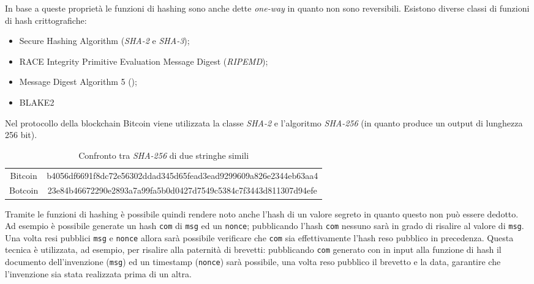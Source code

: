 In base a queste proprietà le funzioni di hashing sono anche dette \textit{one-way} in quanto non sono reversibili.\newline\newline
Esistono diverse classi di funzioni di hash crittografiche:
\begin{itemize}
    \item Secure Hashing Algorithm (\textit{SHA-2} e \textit{SHA-3});
    \item RACE Integrity Primitive  Evaluation Message Digest (\textit{RIPEMD});
    \item Message Digest Algorithm 5 ();
    \item BLAKE2
\end{itemize}

Nel protocollo della blockchain Bitcoin viene utilizzata la classe \textit{SHA-2} e l'algoritmo \textit{SHA-256} (in quanto produce un output di lunghezza 256 bit).
\begin{table}
    \caption{Confronto tra \textit{SHA-256} di due stringhe simili}
    \centering
    \begin{tabular}{c||c}
        Bitcoin & b4056df6691f8dc72e56302ddad345d65fead3ead9299609a826e2344eb63aa4 \\
        \cline{1-2}
        Botcoin & 23e84b46672290e2893a7a99fa5b0d0427d7549c5384c7f3443d811307d94efe \\
    \end{tabular}
\end{table}
Tramite le funzioni di hashing è possibile quindi rendere noto anche l'hash di un valore segreto in quanto questo non può essere dedotto. Ad esempio è possibile generate un hash \texttt{com} di \texttt{msg} ed un \texttt{nonce}; pubblicando l'hash \texttt{com} nessuno sarà in grado di risalire al valore di \texttt{msg}. Una volta resi pubblici \texttt{msg} e \texttt{nonce} allora sarà possibile verificare che \texttt{com} sia effettivamente l'hash reso pubblico in precedenza.\newline
Questa tecnica è utilizzata, ad esempio, per risalire alla paternità di brevetti: pubblicando \texttt{com} generato con in input alla funzione di hash il documento dell'invenzione (\texttt{msg}) ed un timestamp (\texttt{nonce}) sarà possibile, una volta reso pubblico il brevetto e la data, garantire che l'invenzione sia stata realizzata prima di un altra.

